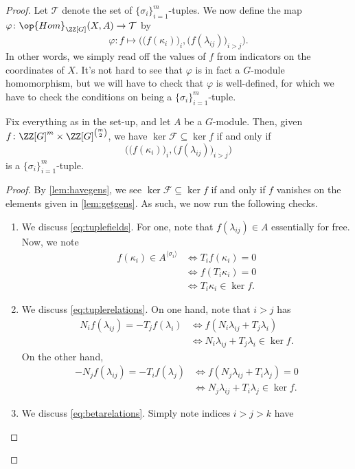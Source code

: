 \documentclass{article}
\numberwithin{equation}{section}
\begin{document}
\begin{proof}
	Let $\mathcal T$ denote the set of $\{\sigma_i\}_{i=1}^m$-tuples. We now define the map $\varphi\colon\op{Hom}_{\ZZ[G]}(X,A)\to\mathcal T$ by
	\[\varphi\colon f\mapsto\Big(\big(f(\kappa_i)\big)_i,\big(f(\lambda_{ij})\big)_{i>j}\Big).\]
	In other words, we simply read off the values of $f$ from indicators on the coordinates of $X$. It's not hard to see that $\varphi$ is in fact a $G$-module homomorphism, but we will have to check that $\varphi$ is well-defined, for which we have to check the conditions on being a $\{\sigma_i\}_{i=1}^m$-tuple.
	\begin{lemma} \label{lem:kernelisrelations}
		Fix everything as in the set-up, and let $A$ be a $G$-module. Then, given $f\colon\ZZ[G]^m\times\ZZ[G]^{\binom m2}$, we have $\ker\mathcal F\subseteq\ker f$ if and only if
		\[\Big(\big(f(\kappa_i)\big)_i,\big(f(\lambda_{ij})\big)_{i>j}\Big)\]
		is a $\{\sigma_i\}_{i=1}^m$-tuple.
	\end{lemma}
	\begin{proof}
		By \autoref{lem:havegens}, we see $\ker\mathcal F\subseteq\ker f$ if and only if $f$ vanishes on the elements given in \autoref{lem:getgens}. As such, we now run the following checks.
		\begin{enumerate}
			\item We discuss \autoref{eq:tuplefields}. For one, note that $f(\lambda_{ij})\in A$ essentially for free. Now, we note
			\begin{align*}
				f(\kappa_i)\in A^{\langle\sigma_i\rangle} &\iff T_if(\kappa_i)=0 \\
				&\iff f(T_i\kappa_i)=0 \\
				&\iff T_i\kappa_i\in\ker f.
			\end{align*}
			\item We discuss \autoref{eq:tuplerelations}. On one hand, note that $i>j$ has
			\begin{align*}
				N_if(\lambda_{ij})=-T_jf(\lambda_i) &\iff f(N_i\lambda_{ij}+T_j\lambda_i) \\
				&\iff N_i\lambda_{ij}+T_j\lambda_i\in\ker f.
			\end{align*}
			On the other hand,
			\begin{align*}
				-N_jf(\lambda_{ij})=-T_if(\lambda_j) &\iff f(N_j\lambda_{ij}+T_i\lambda_j)=0 \\
				&\iff N_j\lambda_{ij}+T_i\lambda_j\in\ker f.
			\end{align*}
			\item We discuss \autoref{eq:betarelations}. Simply note indices $i>j>k$ have

\end{enumerate}
\end{proof}
\end{proof}
\end{document}
